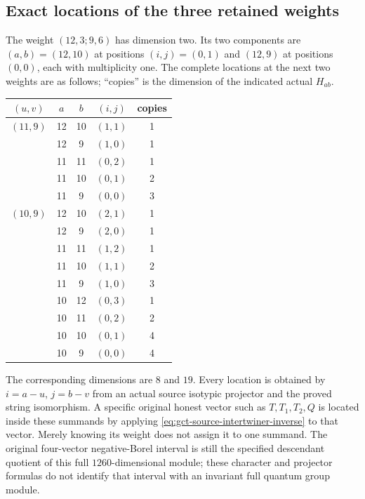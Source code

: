 \subsection{Exact locations of the three retained weights}

The weight $(12,3;9,6)$ has dimension two. Its two components
are $(a,b)=(12,10)$ at positions $(i,j)=(0,1)$ and
$(12,9)$ at positions $(0,0)$, each with multiplicity one.
The complete locations at the next two weights are as follows;
``copies'' is the dimension of the indicated actual $H_{ab}$.
\begin{center}\small
\begin{tabular}{c|cc|c|c}
\toprule
$(u,v)$ & $a$ & $b$ & $(i,j)$ & copies\\\midrule
$(11,9)$&12&10&$(1,1)$&1\\
&12&9&$(1,0)$&1\\
&11&11&$(0,2)$&1\\
&11&10&$(0,1)$&2\\
&11&9&$(0,0)$&3\\\midrule
$(10,9)$&12&10&$(2,1)$&1\\
&12&9&$(2,0)$&1\\
&11&11&$(1,2)$&1\\
&11&10&$(1,1)$&2\\
&11&9&$(1,0)$&3\\
&10&12&$(0,3)$&1\\
&10&11&$(0,2)$&2\\
&10&10&$(0,1)$&4\\
&10&9&$(0,0)$&4\\\bottomrule
\end{tabular}
\end{center}
The corresponding dimensions are $8$ and $19$. Every location
is obtained by $i=a-u$, $j=b-v$ from an actual source isotypic
projector and the proved string isomorphism. A specific original
honest vector such as $T,T_1,T_2,Q$ is located inside these
summands by applying \eqref{eq:gct-source-intertwiner-inverse}
to that vector. Merely knowing its weight does not assign it
to one summand. The original four-vector negative-Borel interval
is still the specified descendant quotient of this full
$1260$-dimensional module; these character and projector formulas
do not identify that interval with an invariant full quantum
group module.

